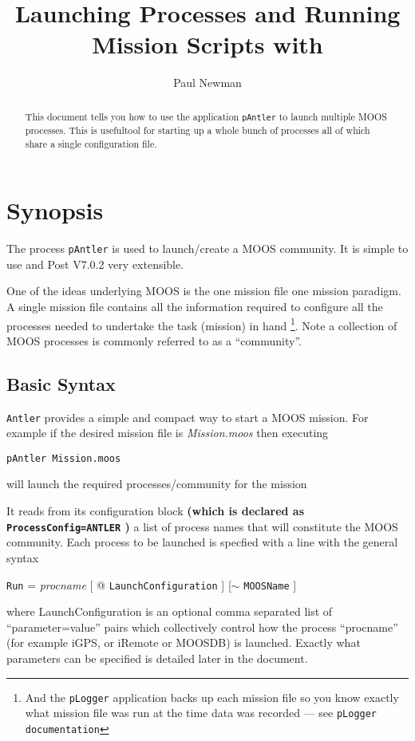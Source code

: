 \documentclass[a4paper,10pt]{article}
\title{Launching Processes and Running Mission Scripts with \code{Antler}}
\author{Paul Newman}
\newcommand{\Code}[1]{\texttt{#1} }
\newcommand{\code}[1]{\Code{#1} }
\begin{document}
\maketitle

\begin{center}
\end{center}


\begin{abstract}
This document tells you how to use the application \code{pAntler} to launch multiple MOOS processes. This is usefultool for starting up a whole bunch of processes all of which share a single configuration file.
\end{abstract}

\newpage
\tableofcontents
\newpage

\section{Synopsis}
The process \code{pAntler} is used to launch/create a MOOS
community. It is  simple to use and Post V7.0.2 very extensible. 

One of the ideas underlying MOOS is the one mission file one mission paradigm. A single mission file contains all the information required to configure all the processes needed to undertake the task (mission) in hand \footnote{And the \code{pLogger} application backs up each mission file so you know exactly what mission file was run at the time data was recorded --- see \code{pLogger documentation}}.  Note a collection of MOOS processes is commonly referred to as a ``community''. 


\subsection{Basic Syntax}

\code{Antler} provides a simple and compact way to start a MOOS mission. For example if the desired mission file is
{\it{Mission.moos}} then executing
\begin{center}
\code{pAntler Mission.moos}
\end{center}
will launch the required processes/community for the  mission

It reads from its configuration block {\textbf{(which is declared as  \code{ProcessConfig=ANTLER})}} a list of process names that will constitute
the MOOS community. Each process to be launched is specfied with a line with the general syntax
\begin{center}
{\code{Run}} = {\it{procname}} [ @ \code{LaunchConfiguration}] [$\sim$ \code{MOOSName}]
\end{center}
where LaunchConfiguration is an optional  comma separated list of ``parameter=value'' pairs which collectively control how the process ``procname'' (for example iGPS, or iRemote or MOOSDB) is launched. Exactly what parameters can be specified is detailed later in the document.
\end{document}
